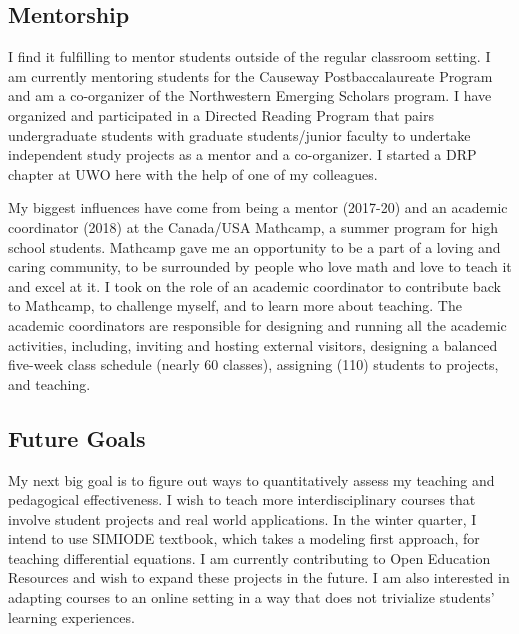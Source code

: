 \documentclass[10pt]{amsbook}
\begin{document}
\subsection*{Mentorship}
  I find it fulfilling to mentor students outside of the regular classroom setting. 
  I am currently mentoring students for the Causeway Postbaccalaureate Program and am a co-organizer of the Northwestern Emerging Scholars program.  
  I have organized and participated in a Directed Reading Program that pairs undergraduate students with graduate students/junior faculty to undertake independent study projects as a mentor and a co-organizer. 
  I started a DRP chapter at UWO here with the help of one of my colleagues. 

  My biggest influences have come from being a mentor (2017-20) and an academic coordinator
  (2018) at the Canada/USA Mathcamp, a summer program for high school students.
  Mathcamp gave me an opportunity to be a part of a loving and caring community, to be surrounded by people who love math and love to teach it and excel at it.
  I took on the role of an academic coordinator to contribute back to Mathcamp, to challenge myself, and to learn more about teaching. 
  The academic coordinators are responsible for designing and running all the academic activities, including, inviting and hosting external visitors, designing a balanced five-week class schedule (nearly 60 classes), assigning (110) students to projects, and teaching. 

  \subsection*{Future Goals}
  My next big goal is to figure out ways to quantitatively assess my teaching and pedagogical effectiveness.
  I wish to teach more interdisciplinary courses that involve student projects and real world applications.
  In the winter quarter, I intend to use SIMIODE textbook, which takes a modeling first approach, for teaching differential equations.
  I am currently contributing to Open Education Resources and wish to expand these projects in the future. 
  I am also interested in adapting courses to an online setting in a way that does not trivialize students' learning experiences.


  \newpage 
\end{document}
